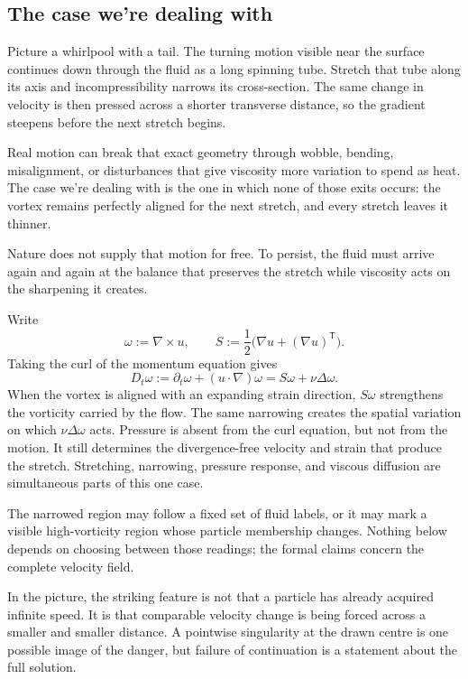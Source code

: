 \subsection{The case we're dealing with}\label{sub:ThePerfectlyStretchingVortex}

Picture a whirlpool with a tail.
The turning motion visible near the surface continues down through the fluid as a long spinning tube.
Stretch that tube along its axis and incompressibility narrows its cross-section.
The same change in velocity is then pressed across a shorter transverse distance, so the gradient steepens before the next stretch begins.

Real motion can break that exact geometry through wobble, bending, misalignment, or disturbances that give viscosity more variation to spend as heat.
The case we're dealing with is the one in which none of those exits occurs: the vortex remains perfectly aligned for the next stretch, and every stretch leaves it thinner.

Nature does not supply that motion for free.
To persist, the fluid must arrive again and again at the balance that preserves the stretch while viscosity acts on the sharpening it creates.

Write
\[
  \omega:=\nabla\times u,
  \qquad
  S:=\frac12\bigl(\nabla u+(\nabla u)^{\mathsf T}\bigr).
\]
Taking the curl of the momentum equation gives
\begin{equation}\label{eq:VorticityEquation}
  D_t\omega
  :=\partial_t\omega+(u\cdot\nabla)\omega
  =S\omega+\nu\Delta\omega.
\end{equation}
When the vortex is aligned with an expanding strain direction, \(S\omega\) strengthens the vorticity carried by the flow.
The same narrowing creates the spatial variation on which \(\nu\Delta\omega\) acts.
Pressure is absent from the curl equation, but not from the motion.
It still determines the divergence-free velocity and strain that produce the stretch.
Stretching, narrowing, pressure response, and viscous diffusion are simultaneous parts of this one case.

The narrowed region may follow a fixed set of fluid labels, or it may mark a visible high-vorticity region whose particle membership changes.
Nothing below depends on choosing between those readings; the formal claims concern the complete velocity field.

In the picture, the striking feature is not that a particle has already acquired infinite speed.
It is that comparable velocity change is being forced across a smaller and smaller distance.
A pointwise singularity at the drawn centre is one possible image of the danger, but failure of continuation is a statement about the full solution.

